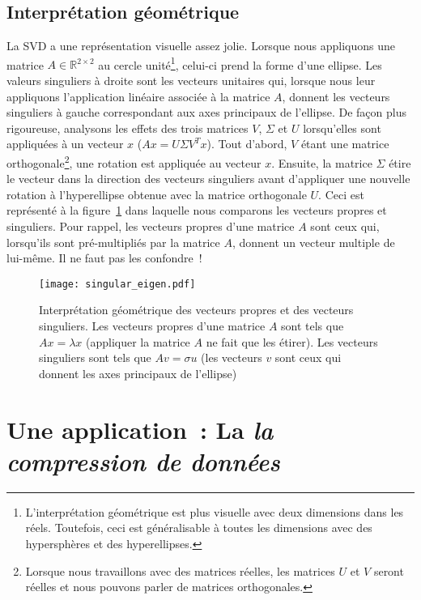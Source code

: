 \documentclass[a4paper, 11pt]{article}
\begin{document}
\subsection{Interprétation géométrique}\label{subsec:geometric}
La SVD a une représentation visuelle assez jolie. Lorsque nous appliquons une matrice $A \in \mathbb{R}^{2 \times 2}$ au cercle unité\footnote{L'interprétation géométrique est plus visuelle avec deux dimensions dans les réels. Toutefois, ceci est généralisable à toutes les dimensions avec des hypersphères et des hyperellipses.}, celui-ci prend la forme d'une ellipse. Les valeurs singuliers à droite sont les vecteurs unitaires qui, lorsque nous leur appliquons l'application linéaire associée à la matrice $A$, donnent les vecteurs singuliers à gauche correspondant aux axes principaux de l'ellipse. De façon plus rigoureuse, analysons les effets des trois matrices $V$, $\Sigma$ et $U$ lorsqu'elles sont appliquées à un vecteur $x$ ($Ax = U\Sigma V^T x$). Tout d'abord, $V$ étant une matrice orthogonale\footnote{Lorsque nous travaillons avec des matrices réelles, les matrices $U$ et $V$ seront réelles et nous pouvons parler de matrices orthogonales.}, une rotation est appliquée au vecteur $x$. Ensuite, la matrice $\Sigma$ étire le vecteur dans la direction des vecteurs singuliers avant d'appliquer une nouvelle rotation à l'hyperellipse obtenue avec la matrice orthogonale $U$. Ceci est représenté à la figure~\ref{fig:singular_eigen} dans laquelle nous comparons les vecteurs propres et singuliers. Pour rappel, les vecteurs propres d'une matrice $A$ sont ceux qui, lorsqu'ils sont pré-multipliés par la matrice $A$, donnent un vecteur multiple de lui-même. Il ne faut pas les confondre~!
\begin{figure}[!htb]
    \centering
    \texttt{[image: singular\_eigen.pdf]}
    \caption{Interprétation géométrique des vecteurs propres et des vecteurs singuliers. Les vecteurs propres d'une matrice $A$ sont tels que $Ax = \lambda x$ (appliquer la matrice $A$ ne fait que les étirer). Les vecteurs singuliers sont tels que $Av = \sigma u$ (les vecteurs $v$ sont ceux qui donnent les axes principaux de l'ellipse)}
    \label{fig:singular_eigen}
\end{figure}

\newpage

\section{Une application~: La \textit{la compression de données}}\label{sec:BASS}
\end{document}
